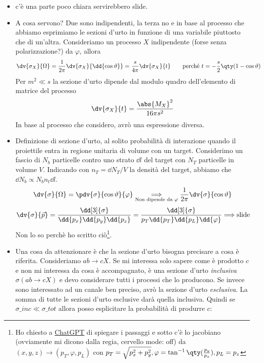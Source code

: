 \begin{itemize}
        \item c'è una parte poco chiara servirebbero slide.
        \item A cosa servono? Due sono indipendenti, la terza no e in base al processo che abbiamo esprimiamo le sezioni d'urto in funzione di una variabile piuttosto che di un'altra. Consideriamo un processo $X$ indipendente (forse senza polarizzazione?) da $\varphi$, allora 
        \begin{equation*}
        \dv{\sigma_X}{\Omega}=\frac1{2\pi}\dv{\sigma_X}{\dd{\cos\vartheta}}=\frac s{4\pi}\dv{\sigma_X}{t}\qquad \text{perché }t=-\frac s2\qty(1-\cos\vartheta)
        \end{equation*}
        Per $m^2\ll s$ la sezione d'urto dipende dal modulo quadro dell'elemento di matrice del processo
        \begin{equation*}
        \dv{\sigma_X}{t}=\frac{\abs{M_X}^2}{16\pi s^2}
        \end{equation*}
        In base al processo che considero, avrò una espressione diversa.
        \item Definizione di sezione d'urto, al solito probabilità di interazione quando il proiettile entra in regione unitaria di volume con un target. Considerimo un fascio di $N_b$ particelle contro uno strato $\dd l$ del target con $N_T$ particelle in volume $V$. Indicando con $n_T=\dd N_T/V$ la densità del target, abbiamo che $\dd{N_b}\propto N_b n_t\dd{l}$. 
        \begin{equation*}
        \dv{\sigma}{\Omega }=\pdv{\sigma}{\cos\vartheta}{\varphi}\underset{\text{Non dipende da } \varphi}{\Longrightarrow}\frac1{2\pi}\dv{\sigma}{\cos\vartheta}
        \end{equation*}
        \begin{equation*}
        \dv{\sigma}{\vec p}=\frac{\dd[3]{\sigma}}{\dd{p_x}\dd{p_y}\dd{p_z}}=\frac{\dd[3]{\sigma}}{p_T\dd{p_T}\dd{p_L}\dd{\varphi}}\Longrightarrow \text{slide}
        \end{equation*}
        Non lo so perchè ho scritto ciò\footnote{Ho chiesto a \href{https://chatgpt.com/share/672ba43f-ff50-800b-bc35-8bc186c6df2a}{ChatGPT} di spiegare i passaggi e sotto c'è lo jacobiano  (ovviamente mi dicono dalla regia, cervello mode: off) da $(x,y,z)\to(p_T,\varphi,p_L)$ con $p_T=\sqrt{p_x^2+p_y^2},\varphi=\tan^{-1}\qty(\frac{p_y}{p_x}),p_L=p_z$}.
        \item Una cosa da attenzionare è che la sezione d'urto bisogna precisare a cosa è riferita. Consideriamo $ab\to cX$. Se mi interessa solo sapere come è prodotto $c$ e non mi interessa da cosa è accompagnato, è una sezione d'urto \textit{inclusiva} $\sigma(ab\to cX)$ e devo considerare tutti i processi che lo producono. Se invece sono interessato ad un canale ben preciso, avrò la sezione d'urto \textit{esclusiva}. La somma di tutte le sezioni d'urto esclusive darà quella inclusiva. Quindi se $\sigma\_{inc}\ll\sigma\_{tot}$ allora posso esplicitare la probabilità di produrre $c$:

\end{itemize}

